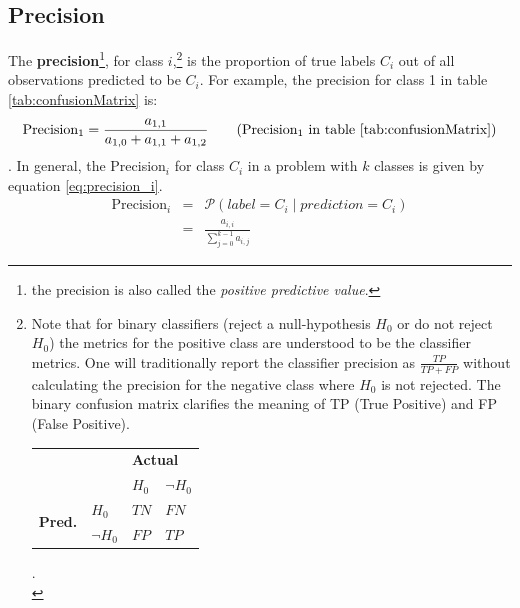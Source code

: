 \subsection{Precision}
\par{
    The \textbf{precision}\footnote{the precision is also called the \textit{positive predictive value}.}, for class $i$,\footnote{
        Note that for binary classifiers (reject a null-hypothesis $H_0$ or do not reject $H_0$) the metrics for the positive class are understood to be the classifier metrics. 
        One will traditionally report the classifier precision as $\frac{TP}{TP+FP}$ without calculating the precision for the negative class where $H_0$ is not rejected.
        The binary confusion matrix clarifies the meaning of TP (True Positive) and FP (False Positive).
        \begin{tabular}{clll}
            \multicolumn{1}{l}{}                &                        & \multicolumn{2}{l}{\textbf{Actual}}           \\
            \multicolumn{1}{l}{}                &                        & $H_0$   & $\neg H_0$                         \\ \cline{3-4} 
            \multirow{2}{*}{\textbf{Pred.}}   & \multicolumn{1}{l|}{$H_0$} & $TN$ & \multicolumn{1}{l|}{$FN$} \\
                                                & \multicolumn{1}{l|}{$\neg H_0$} & $FP$  & \multicolumn{1}{l|}{$TP$ } \\ \hline
            \end{tabular}.\\
    } is the proportion of true labels $C_i$ out of all observations predicted to be $C_i$. 
    For example, the precision for class 1 in table \ref{tab:confusionMatrix} is:
    \begin{equation}
        \text{Precision}_1 = \frac{a_{1,1}}{a_{1,0} + a_{1,1} + a_{1, 2}} \tag{Precision$_1$ in table \ref{tab:confusionMatrix}}
    \end{equation}.
    In general, the Precision$_i$ for class $C_i$ in a problem with $k$ classes is given by equation \ref{eq:precision_i}.
    \begin{eqnarray}
        \text{Precision}_i &=& \mathcal{P} \left( label = C_i \mid prediction = C_i \right) \\
        &=& \frac{a_{i, i}}{\sum_{j=0}^{k-1} a_{i, j}} \label{eq:precision_i}
    \end{eqnarray}
}
